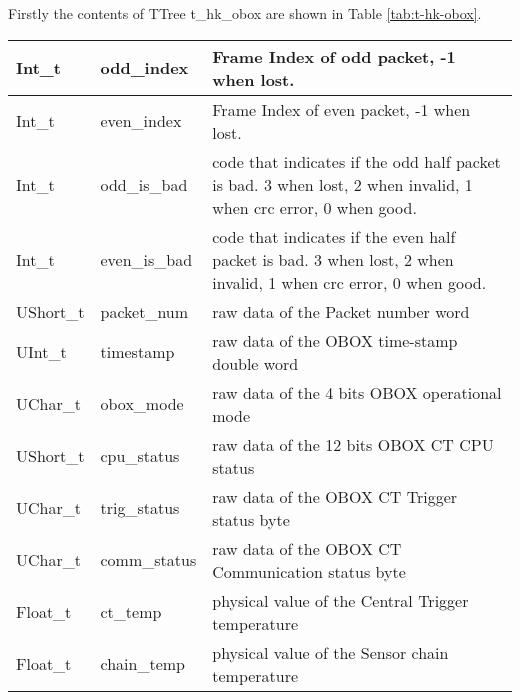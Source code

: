 \documentclass[a4paper, 12pt, onecolumn]{article}
\begin{document}
Firstly the contents of TTree t\_hk\_obox are shown in Table \ref{tab:t-hk-obox}.

\begin{center}
  \label{tab:t-hk-obox}    
  \tablelasttail{\hline}
  \begin{supertabular}{| p{18mm} | p{38mm} | p{66mm} |}
    Int\_t      & odd\_index               & Frame Index of odd packet, -1 when lost. \\\hline
    Int\_t      & even\_index              & Frame Index of even packet, -1 when lost. \\\hline
    Int\_t      & odd\_is\_bad             & code that indicates if the odd half packet is bad. 3 when lost, 2 when invalid, 1 when crc error, 0 when good. \\\hline
    Int\_t      & even\_is\_bad            & code that indicates if the even half packet is bad. 3 when lost, 2 when invalid, 1 when crc error, 0 when good. \\\hline
    UShort\_t   & packet\_num              & raw data of the Packet number word \\\hline
    UInt\_t     & timestamp                & raw data of the OBOX time-stamp double word \\\hline
    UChar\_t    & obox\_mode               & raw data of the 4 bits OBOX operational mode \\\hline
    UShort\_t   & cpu\_status              & raw data of the 12 bits OBOX CT CPU status \\\hline
    UChar\_t    & trig\_status             & raw data of the OBOX CT Trigger status byte \\\hline
    UChar\_t    & comm\_status             & raw data of the OBOX CT Communication status byte \\\hline
    Float\_t    & ct\_temp                 & physical value of the Central Trigger temperature  \\\hline
    Float\_t    & chain\_temp              & physical value of the Sensor chain temperature \\\hline

\end{supertabular}
\end{center}
\end{document}
